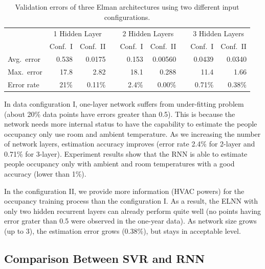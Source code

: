 \begin{table}[t]
    \centering
    \begingroup
    \setlength{\tabcolsep}{3.6pt} %
    \begin{tabular}{lrrcrrcrr}
        \toprule
        & \multicolumn{2}{c}{1 Hidden Layer} && \multicolumn{2}{c}{2 Hidden Layers} && \multicolumn{2}{c}{3 Hidden Layers}\\
        \cmidrule{2-3} \cmidrule{5-6} \cmidrule{8-9}
        & Conf.~I & Conf.~II && Conf.~I & Conf.~II && Conf.~I & Conf.~II\\
        \midrule
        Avg.~error & 0.538      & 0.0175    && 0.153     & 0.00560   && 0.0439      & 0.0340    \\
        Max.~error & 17.8       & 2.82      && 18.1      & 0.288     && 11.4        & 1.66      \\
        Error rate & 21\%       & 0.11\%    && 2.4\%     & 0.00\%    && 0.71\%      & 0.38\%    \\
        \bottomrule
    \end{tabular}
    \endgroup
    \caption{Validation errors of three Elman architectures using two
        different input configurations.}
    \label{tab:verr-stat}
\end{table}

In data configuration I, one-layer network suffers from under-fitting
problem (about 20\% data points have errors greater than 0.5). This is
because the network needs more internal status to have the capability
to estimate the people occupancy only use room and ambient
temperature.  As we increasing the number of network layers,
estimation accuracy improves (error rate 2.4\% for 2-layer and 0.71\%
for 3-layer). Experiment results show that the RNN is able to estimate
people occupancy only with ambient and room temperatures with a good
accuracy (lower than 1\%).

In the configuration II, we provide more information (HVAC powers)
for the occupancy training process than the configuration I. As a
result, the ELNN with only two hidden recurrent layers can
already perform quite well (no points having error grater than 0.5
were observed in the one-year data). As network size grows (up to 3),
the estimation error grows (0.38\%), but stays in acceptable level.

\subsection{Comparison Between SVR and RNN}
\label{sec:comparison_svr_rnn}

